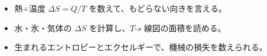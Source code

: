 \makeatletter
\newcommand\qxgcup[4]{\begin{scope}[shift={#1}]
  \fill[#4] ({-#2/2+0.55},0.5) -- ({#2/2-0.55},0.5) -- ({#2/2-0.55+0.25*#3*0.15},{#3*0.72}) -- ({-#2/2+0.55-0.25*#3*0.15},{#3*0.72}) -- cycle;
  \draw[bkInk, line width=0.7pt] ({-#2/2-0.1*#3*0.4},#3) -- ({-#2/2+0.4},0) -- ({#2/2-0.4},0) -- ({#2/2+0.1*#3*0.4},#3);\end{scope}}
\newcommand\qxgbox[3]{\draw[bkInk, line width=0.8pt] #1 rectangle ++(#2,#3);}
\newcommand\qxgdot[1]{\fill[bkBlue] #1 circle (0.75);}
\makeatother


\begin{goal}
\begin{itemize}[label={\color{bkTheme}●}, leftmargin=1.6\zw, itemsep=0pt, topsep=1pt]
\item {}\enspace 熱÷温度 $\Delta S=Q/T$ を数えて、もどらない向きを言える。
\item {}\enspace 水・氷・気体の $\Delta S$ を計算し、$T$-$s$ 線図の面積を読める。
\item {}\enspace 生まれるエントロピーとエクセルギーで、機械の損失を数えられる。
\end{itemize}
\end{goal}


